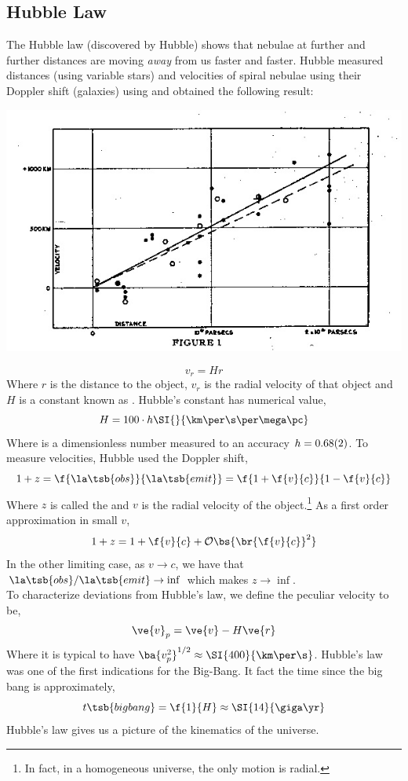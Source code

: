 \documentclass{article}
\begin{document}
\subsection{Hubble Law}

The Hubble law (discovered by Hubble) shows that nebulae at further and further distances are moving \textit{away} from us faster and faster. Hubble measured distances (using variable stars) and velocities of spiral nebulae using their Doppler shift (galaxies) using and obtained the following result:
\begin{center}
    \includegraphics{figures/hubble.jpg}
\end{center}
\[ v_{r} = H r \]
Where $r$ is the distance to the object, $v_{r}$ is the radial velocity of that object and $H$ is a constant known as . Hubble's constant has numerical value,
\[ H = 100 \cdot h \SI{}{\km \per \s \per \mega\pc} \]
Where is a dimensionless number measured to an accuracy $h = \SI{0.68\pm0.02}{}$.
To measure velocities, Hubble used the Doppler shift,
\[ 1+ z = \f{\la\tsb{obs}}{\la\tsb{emit}} = \f{1 + \f{v}{c}}{1 - \f{v}{c}} \]
Where $z$ is called the  and $v$ is the radial velocity of the object.\footnote{In fact, in a homogeneous universe, the only motion is radial.} As a first order approximation in small $v$,
\[ 1 + z = 1 + \f{v}{c} + \mathcal{O}\bs{\br{\f{v}{c}}^2} \]
In the other limiting case, as $v \to c$, we have that ${\la\tsb{obs}}/{\la\tsb{emit}} \to \inf$ which makes $z \to \inf$.\\

To characterize deviations from Hubble's law, we define the peculiar velocity to be,
\[ \ve{v}_p = \ve{v} - H \ve{r} \]
Where it is typical to have $\ba{v_p^2}^{1/2} \approx \SI{400}{\km\per\s}$. Hubble's law was one of the first indications for the Big-Bang. It fact the time since the big bang is approximately,
\[ t\tsb{big bang} = \f{1}{H} \approx \SI{14}{\giga\yr} \]
Hubble's law gives us a picture of the kinematics of the universe.
\end{document}
